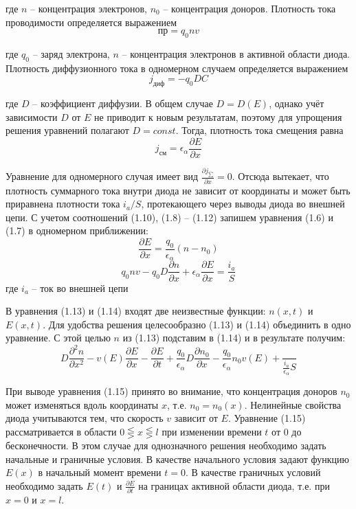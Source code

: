 \documentclass[a4paper, 12pt]{article}
\begin{document}
где $n$ – концентрация электронов, $n_0$ – концентрация доноров. Плотность тока
проводимости определяется выражением
\[\text{пр} = q_0 n v\]

где $q_0$ – заряд электрона, $n$ – концентрация электронов в активной области диода.
Плотность диффузионного тока в одномерном случаем определяется
выражением
\[j_{\text{диф}} = -q_0 D C\]

где $D$ – коэффициент диффузии. В общем случае $D = D(E)$, однако учёт
зависимости $D$ от $E$ не приводит к новым результатам, поэтому для упрощения
решения уравнений полагают $D = const$. Тогда, плотность тока смещения равна
\[j_{\text{см}} = \epsilon_{\alpha} \frac{\partial E}{\partial x}\]


Уравнение для одномерного случая имеет вид $\frac{\partial j_{\sum}}{\partial x} = 0$. Отсюда вытекает,
что плотность суммарного тока внутри диода не зависит от координаты и может
быть приравнена плотности тока $i_a/S$, протекающего через выводы диода во
внешней цепи.
С учетом соотношений (1.10), (1.8) – (1.12) запишем уравнения (1.6) и (1.7)
в одномерном приближении:
\[\frac{\partial E}{\partial x} = \frac{q_0}{\epsilon_{\alpha}}(n-n_0)\]
\[q_0 nv - q_0 D \frac{\partial n}{\partial x} + \epsilon_{\alpha}\frac{\partial E}{\partial x} = \frac{i_a}{S}\]
где $i_a$ – ток во внешней цепи


В уравнения (1.13) и (1.14) входят две неизвестные функции: $n(x,t)$ и $E(x,t)$.
Для удобства решения целесообразно (1.13) и (1.14) объединить в одно уравнение.
С этой целью $n$ из (1.13) подставим в (1.14) и в результате получим:
\[D\frac{\partial^2 n}{\partial x^2} - v(E)  \frac{\partial E}{\partial x} -  \frac{\partial E}{\partial t} + \frac{q_0}{\epsilon_{\alpha}} D \frac{\partial n_0}{\partial x} - \frac{q_0}{\epsilon_{\alpha}}n_0v(E) + \frac{}{\frac{i_a}{\epsilon_{\alpha}} S}\]


При выводе уравнения (1.15) принято во внимание, что концентрация доноров $n_0$
может изменяться вдоль координаты $x$, т.е. $n_0 = n_0(x)$. Нелинейные свойства диода
учитываются тем, что скорость $v$ зависит от $E$.
Уравнение (1.15) рассматривается в области $0 \lesseqgtr x \lesseqgtr l$ при изменении
времени $t$ от $0$ до бесконечности. В этом случае для однозначного решения
необходимо задать начальные и граничные условия. В качестве начального
условия задают функцию $E(x)$ в начальный момент времени $t=0$. В качестве
граничных условий необходимо задать $E(t)$ и $\frac{\partial E}{\partial t}$ на границах активной области
диода, т.е. при$ x = 0$ и $x = l$.
\end{document}
